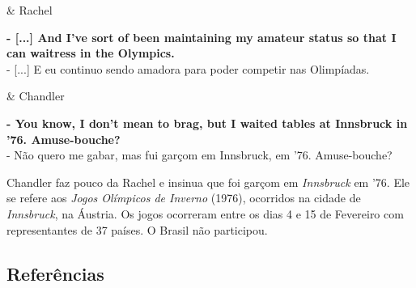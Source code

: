 \begin{tcolorbox}[enhanced,center upper,
    drop fuzzy shadow southeast, boxrule=0.3pt,
    lower separated=false,
    colframe=black!30!dialogoBorder,colback=white]
\begin{minipage}[c]{0.16\linewidth}
   & \centering \scriptsize{Rachel}
\end{minipage}
\hfill
\begin{minipage}[c]{0.8\linewidth}
  \textbf{- [...] And I've sort of been maintaining my amateur status so that I can waitress in the Olympics.}\\
  - [...] E eu continuo sendo amadora para poder competir nas Olimpíadas.
\end{minipage}

\medskip
\begin{minipage}[c]{0.16\linewidth}
   & \centering \scriptsize{Chandler}
\end{minipage}
\hfill
\begin{minipage}[c]{0.8\linewidth}
  \textbf{- You know, I don't mean to brag, but I waited tables at Innsbruck in '76. Amuse-bouche?}\\
  - Não quero me gabar, mas fui garçom em Innsbruck, em '76. Amuse-bouche?
\end{minipage}
\end{tcolorbox}

Chandler faz pouco da Rachel e insinua que foi garçom em
\emph{Innsbruck} em '76. Ele se refere aos \emph{Jogos Olímpicos de
Inverno} (1976), ocorridos na cidade de \emph{Innsbruck}, na Áustria. Os
jogos ocorreram entre os dias 4 e 15 de Fevereiro com representantes de
37 países. O Brasil não participou.

\hypertarget{referuxeancias-3}{%
\subsection{Referências}\label{referuxeancias-3}}

